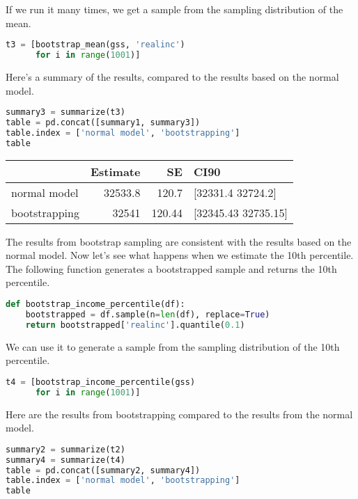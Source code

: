 If we run it many times, we get a sample from the sampling distribution
of the mean.

\begin{lstlisting}[language=Python,style=source]
t3 = [bootstrap_mean(gss, 'realinc')
      for i in range(1001)]
\end{lstlisting}

Here's a summary of the results, compared to the results based on the
normal model.

\begin{lstlisting}[language=Python,style=source]
summary3 = summarize(t3)
table = pd.concat([summary1, summary3])
table.index = ['normal model', 'bootstrapping']
table
\end{lstlisting}

\begin{tabular}{lrrl}
\toprule
 & Estimate & SE & CI90 \\
\midrule
normal model & 32533.8 & 120.7 & [32331.4 32724.2] \\
bootstrapping & 32541 & 120.44 & [32345.43 32735.15] \\
\bottomrule
\end{tabular}

The results from bootstrap sampling are consistent with the results
based on the normal model. Now let's see what happens when we estimate
the 10th percentile. The following function generates a bootstrapped
sample and returns the 10th percentile.

\begin{lstlisting}[language=Python,style=source]
def bootstrap_income_percentile(df):
    bootstrapped = df.sample(n=len(df), replace=True)
    return bootstrapped['realinc'].quantile(0.1)
\end{lstlisting}

We can use it to generate a sample from the sampling distribution of the
10th percentile.

\begin{lstlisting}[language=Python,style=source]
t4 = [bootstrap_income_percentile(gss)
      for i in range(1001)]
\end{lstlisting}

Here are the results from bootstrapping compared to the results from the
normal model.

\begin{lstlisting}[language=Python,style=source]
summary2 = summarize(t2)
summary4 = summarize(t4)
table = pd.concat([summary2, summary4])
table.index = ['normal model', 'bootstrapping']
table
\end{lstlisting}

